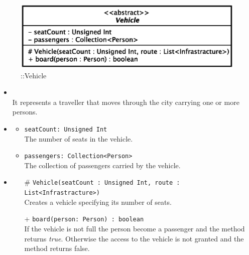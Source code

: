 \begin{figure}[h]
\centering
\includegraphics[scale=0.6,keepaspectratio]{images/solution/app/backend/vehicle.eps}
\caption{\pActive::Vehicle}
\label{fig:sd-app-vehicle}
\end{figure}
\FloatBarrier
\begin{itemize}
  \item \textbf{\descr} \\
    It represents a traveller that moves through the city carrying one or more
persons.
  \item \textbf{\attrs}
  \begin{itemize}
    \item \texttt{seatCount: Unsigned Int} \\
The number of seats in the vehicle.
    \item \texttt{passengers: Collection<Person>} \\
The collection of passengers carried by the vehicle.
  \end{itemize}
  \item \textbf{\ops}
  \begin{itemize} 
    \item[\#] \texttt{Vehicle(seatCount : Unsigned Int, route : List<Infrastracture>)} \\
Creates a vehicle specifying its number of seats.
    \item[+] \texttt{board(person: Person) : boolean} \\
If the vehicle is not full the person become a passenger and the method 
returns \textit{true}. Otherwise the access to the vehicle is not granted and 
the method returns false.
  \end{itemize}
\end{itemize}
